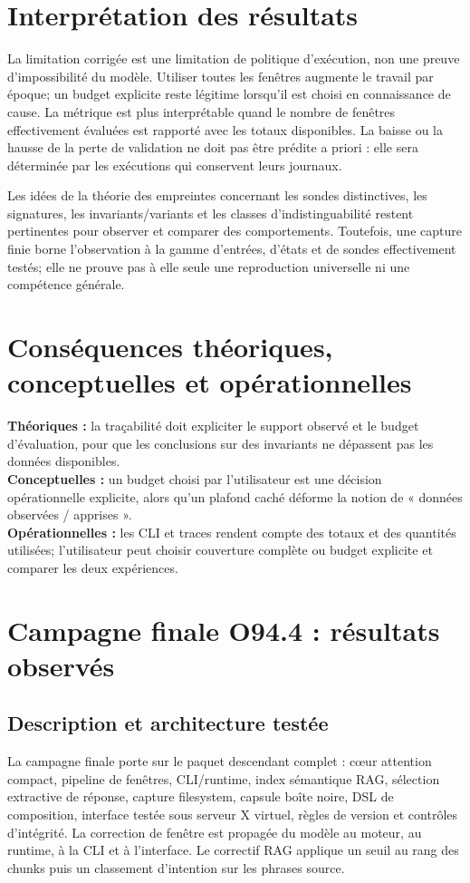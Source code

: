 \documentclass[11pt,a4paper]{article}
\begin{document}
\section{Interprétation des résultats}
La limitation corrigée est une limitation de politique d'exécution, non une preuve d'impossibilité du modèle. Utiliser toutes les fenêtres augmente le travail par époque; un budget explicite reste légitime lorsqu'il est choisi en connaissance de cause. La métrique est plus interprétable quand le nombre de fenêtres effectivement évaluées est rapporté avec les totaux disponibles. La baisse ou la hausse de la perte de validation ne doit pas être prédite a priori : elle sera déterminée par les exécutions qui conservent leurs journaux.

Les idées de la théorie des empreintes concernant les sondes distinctives, les signatures, les invariants/variants et les classes d'indistinguabilité restent pertinentes pour observer et comparer des comportements. Toutefois, une capture finie borne l'observation à la gamme d'entrées, d'états et de sondes effectivement testés; elle ne prouve pas à elle seule une reproduction universelle ni une compétence générale.

\section{Conséquences théoriques, conceptuelles et opérationnelles}
\textbf{Théoriques :} la traçabilité doit expliciter le support observé et le budget d'évaluation, pour que les conclusions sur des invariants ne dépassent pas les données disponibles.\\
\textbf{Conceptuelles :} un budget choisi par l'utilisateur est une décision opérationnelle explicite, alors qu'un plafond caché déforme la notion de « données observées / apprises ».\\
\textbf{Opérationnelles :} les CLI et traces rendent compte des totaux et des quantités utilisées; l'utilisateur peut choisir couverture complète ou budget explicite et comparer les deux expériences.

\section{Campagne finale O94.4 : résultats observés}
\subsection{Description et architecture testée}
La campagne finale porte sur le paquet descendant complet : cœur attention compact, pipeline de fenêtres, CLI/runtime, index sémantique RAG, sélection extractive de réponse, capture filesystem, capsule boîte noire, DSL de composition, interface testée sous serveur X virtuel, règles de version et contrôles d'intégrité. La correction de fenêtre est propagée du modèle au moteur, au runtime, à la CLI et à l'interface. Le correctif RAG applique un seuil au rang des chunks puis un classement d'intention sur les phrases source.
\end{document}

